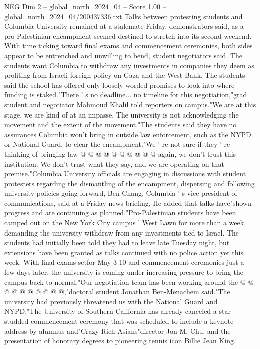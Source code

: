 \begin{textsample}{NEG Dim 2 – global\_north\_2024\_04 – Score 1.00 – global\_north\_2024\_04/200437336.txt}  \label{ex:f2_neg_280}
Talks between protesting students and Columbia University remained at a stalemate Friday, demonstrators said, as a pro-Palestinian encampment seemed destined to stretch into its second weekend.
With time ticking toward final exams and commencement ceremonies, both sides appear to be entrenched and unwilling to bend, student negotiators said.
The students want Columbia to withdraw any investments in companies they deem as profiting from Israeli foreign policy on Gaza and the West Bank.
The students said the school has offered only loosely worded promises to look into where funding is staked."There ' s no deadline... no timeline for this negotiation,"grad student and negotiator Mahmoud Khalil told reporters on campus."We are at this stage, we are kind of at an impasse.
The university is not acknowledging the movement and the extent of the movement."The students said they have no assurances Columbia won't bring in outside law enforcement, such as the NYPD or National Guard, to clear the encampment."We ' re not sure if they ' re thinking of bringing law @ @ @ @ @ @ @ @ @ @ again, we don't trust this institution.
We don't trust what they say, and we are operating on that premise."Columbia University officials are engaging in discussions with student protesters regarding the dismantling of the encampment, dispersing and following university policies going forward, Ben Chang, Columbia ' s vice president of communications, said at a Friday news briefing.
He added that talks have"shown progress and are continuing as planned."Pro-Palestinian students have been camped out on the New York City campus ' West Lawn for more than a week, demanding the university withdraw from any investments tied to Israel.
The students had initially been told they had to leave late Tuesday night, but extensions have been granted as talks continued with no police action yet this week.
With final exams setfor May 3-10 and commencement ceremonies just a few days later, the university is coming under increasing pressure to bring the campus back to normal."Our negotiation team has been working around the @ @ @ @ @ @ @ @ @ @,"doctoral student Jonathan Ben-Menachem said."The university had previously threatened us with the National Guard and NYPD."The University of Southern California has already canceled a star-studded commencement ceremony that was scheduled to include a keynote address by alumnus and"Crazy Rich Asians"director Jon M.
Chu, and the presentation of honorary degrees to pioneering tennis icon Billie Jean King.

\end{textsample}
